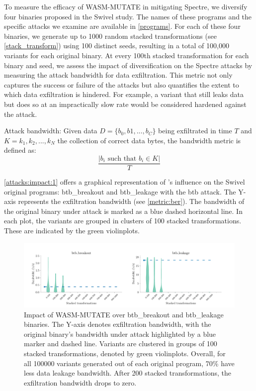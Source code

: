 To measure the efficacy of WASM-MUTATE in mitigating Spectre, we diversify four \Wasm binaries proposed in the Swivel study. 
The names of these programs and the specific attacks we examine are available in \autoref{programs}. 
For each of these four binaries, we generate up to 1000 random stacked transformations (see \autoref{stack_transform}) using 100 distinct seeds, resulting in a total of 100,000 variants for each original binary. 
At every 100th stacked transformation for each binary and seed, we assess the impact of diversification on the Spectre attacks by measuring the attack bandwidth for data exfiltration. 
This metric not only captures the success or failure of the attacks but also quantifies the extent to which data exfiltration is hindered. 
For example, a variant that still leaks data but does so at an impractically slow rate would be considered hardened against the attack.

\begin{definition}{Attack bandwidth:}\label{metric:ber}
    Given data $D=\{b_0, b1, ..., b_C\}$ being exfiltrated in time $T$ and $K = {k_1, k_2, ..., k_N}$ the collection of correct data bytes, the bandwidth metric is defined as:
    $$
        \frac{|b_i\text{ such that } b_i \in K|}{T}
    $$
\end{definition}




\autoref{attacks:impact:1} offers a graphical representation of \tool's influence on the Swivel original programs: btb\_breakout and btb\_leakage with the btb attack. 
The Y-axis represents the exfiltration bandwidth (see \autoref{metric:ber}). 
The bandwidth of the original binary under attack is marked as a blue dashed horizontal line.
In each plot, the variants are grouped in clusters of 100 stacked transformations. 
These are indicated by the green violinplots.

\begin{figure}[h]
    \centering
    \includegraphics[width=\linewidth]{plots/spectre/results.rq3.1.pdf}
    \caption{Impact of WASM-MUTATE over btb\_breakout and btb\_leakage binaries. The Y-axis denotes exfiltration bandwidth, with the original binary's bandwidth under attack highlighted by a blue marker and dashed line. Variants are clustered in groups of 100 stacked transformations, denoted by green violinplots. 
    Overall, for all 100000 variants generated out of each original program, 70\% have less data leakage bandwidth.
    After 200 stacked transformations, the exfiltration bandwidth drops to zero.
    }
  \label{attacks:impact:1}
\end{figure}

